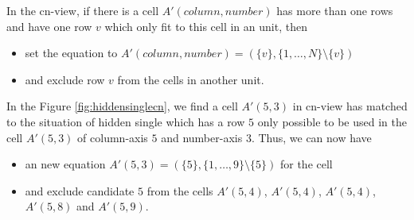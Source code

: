 \documentclass[11pt]{report}
\newcommand{\set}[1]{\{ #1 \}}
\begin{document}
In the cn-view, if there is a cell $A'(column, number)$ has more than one rows and have one row $v$ which only fit to this cell in an unit, then
\begin{itemize}
\item set the equation to $A'(column, number) =(\set{v}, \set{1,\dots,N} \setminus \set{v})$
\item and exclude row $v$ from the cells in another unit.
\end{itemize}
In the Figure \ref{fig:hiddensinglecn}, we find a cell $A'(5, 3)$ in cn-view has matched to the situation of hidden single which has a row $5$ only possible to be used in the cell $A'(5, 3)$ of column-axis $5$ and number-axis $3$. Thus, we can now have 
\begin{itemize}
\item an new equation $A'(5, 3) =(\set{5}, \set{1,\dots,9} \setminus \set{5})$ for the cell
\item and exclude candidate $5$ from the cells $A'(5, 4)$, $A'(5, 4)$, $A'(5, 4)$, $A'(5, 8)$ and $A'(5, 9)$.
\end{itemize}
\end{document}
